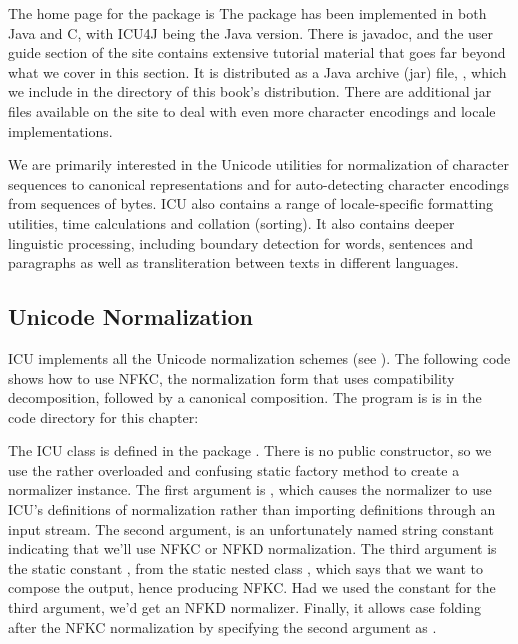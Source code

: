 The home page for the package is
%
%
The package has been implemented in both Java and C, with ICU4J
being the Java version.  There is javadoc, and the user guide
section of the site contains extensive tutorial material that goes
far beyond what we cover in this section.  It is distributed
as a Java archive (jar) file, ,
which we include in the 
directory of this book's distribution.  There are additional jar
files available on the site to deal with even more character
encodings and locale implementations.

We are primarily interested in the Unicode utilities for normalization
of character sequences to canonical representations and for
auto-detecting character encodings from sequences of bytes.  ICU also
contains a range of locale-specific formatting utilities, time
calculations and collation (sorting).  It also contains deeper
linguistic processing, including boundary detection for words,
sentences and paragraphs as well as transliteration between texts in
different languages.

\subsection{Unicode Normalization}\label{section:icu-unicode-normalization}

ICU implements all the Unicode normalization schemes (see
).  The following code shows how to use NFKC,
the normalization form that uses compatibility decomposition, followed
by a canonical composition.
The program is is in the code directory for this chapter:
%

%
%
The ICU class  is defined in the package
.  There is no public constructor, so we use the
rather overloaded and confusing static factory method
 to create a normalizer instance.  The first
argument is , which causes the normalizer to use ICU's
definitions of normalization rather than importing definitions through
an input stream.  The second argument,  is an
unfortunately named string constant indicating that we'll use NFKC or
NFKD normalization.  The third argument is the static constant
, from the static nested class ,
which says that we want to compose the output, hence producing NFKC.
Had we used the constant  for the third argument, we'd
get an NFKD normalizer.  Finally, it allows case folding after the NFKC normalization
by specifying the second argument as .  

